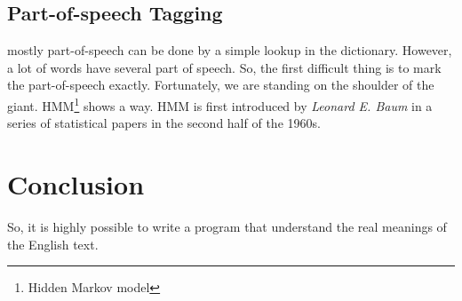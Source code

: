 \subsection{Part-of-speech Tagging}
 mostly part-of-speech can be done by a simple lookup in the dictionary.
However, a lot of words have several part of speech.
So, the first difficult thing is to mark the part-of-speech exactly.
Fortunately, we are standing on the shoulder of the giant. 
HMM\footnote{Hidden Markov model}{\citep{HMM_Based_Part_Of_Speech_Tagging}} shows a way.
HMM is first introduced by \emph{Leonard E. Baum} in a series of statistical papers in the second half of the 1960s.




\section{Conclusion}

So, it is highly possible  to write a program that understand the real meanings of the English text.
